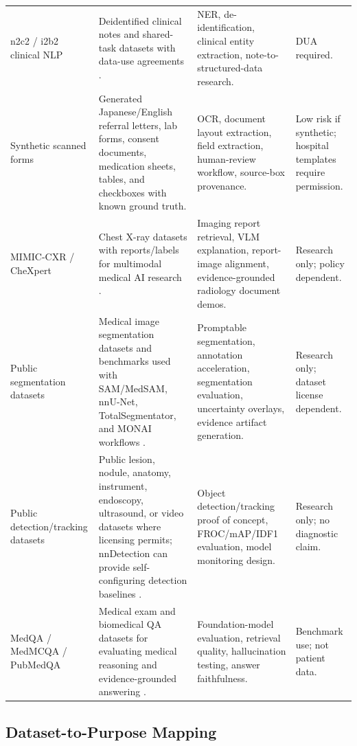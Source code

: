 \begin{longtable}{p{}p{}p{}p{}}
\addlinespace
n2c2 / i2b2 clinical NLP & Deidentified clinical notes and shared-task datasets with data-use agreements \cite{n2c2}. & NER, de-identification, clinical entity extraction, note-to-structured-data research. & DUA required. \\
\addlinespace
Synthetic scanned forms & Generated Japanese/English referral letters, lab forms, consent documents, medication sheets, tables, and checkboxes with known ground truth. & OCR, document layout extraction, field extraction, human-review workflow, source-box provenance. & Low risk if synthetic; hospital templates require permission. \\
\addlinespace
MIMIC-CXR / CheXpert & Chest X-ray datasets with reports/labels for multimodal medical AI research \cite{mimiccxr,chexpert}. & Imaging report retrieval, VLM explanation, report-image alignment, evidence-grounded radiology document demos. & Research only; policy dependent. \\
\addlinespace
Public segmentation datasets & Medical image segmentation datasets and benchmarks used with SAM/MedSAM, nnU-Net, TotalSegmentator, and MONAI workflows \cite{medsam2024,nnunet,totalSegmentator,monaiLabel}. & Promptable segmentation, annotation acceleration, segmentation evaluation, uncertainty overlays, evidence artifact generation. & Research only; dataset license dependent. \\
\addlinespace
Public detection/tracking datasets & Public lesion, nodule, anatomy, instrument, endoscopy, ultrasound, or video datasets where licensing permits; nnDetection can provide self-configuring detection baselines \cite{nndetection}. & Object detection/tracking proof of concept, FROC/mAP/IDF1 evaluation, model monitoring design. & Research only; no diagnostic claim. \\
\addlinespace
MedQA / MedMCQA / PubMedQA & Medical exam and biomedical QA datasets for evaluating medical reasoning and evidence-grounded answering \cite{jin2020medqa,pal2022medmcqa,jin2019pubmedqa}. & Foundation-model evaluation, retrieval quality, hallucination testing, answer faithfulness. & Benchmark use; not patient data. \\
\bottomrule
\end{longtable}

\subsection{Dataset-to-Purpose Mapping}

